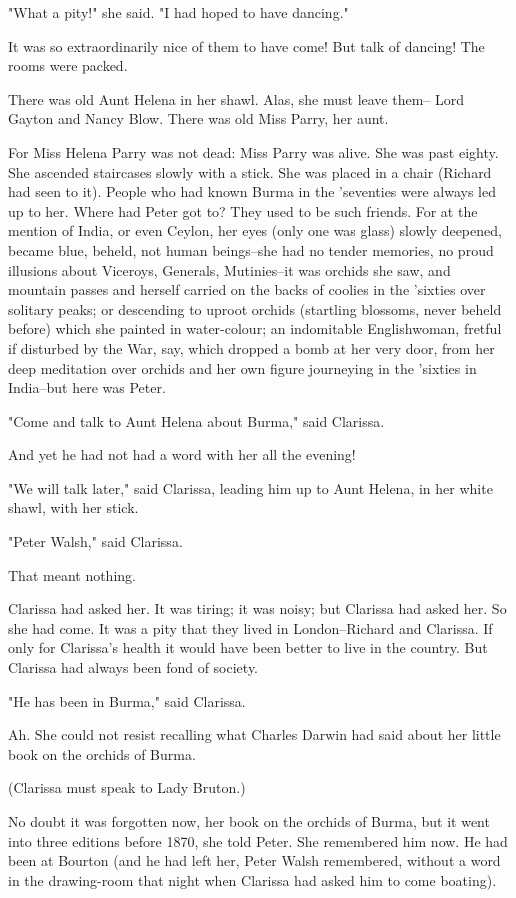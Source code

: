 \documentclass[lang=cn,10pt]{elegantbook}
\begin{document}
"What a pity!" she said.  "I had hoped to have dancing."

It was so extraordinarily nice of them to have come!  But talk of
dancing!  The rooms were packed.

There was old Aunt Helena in her shawl.  Alas, she must leave them--
Lord Gayton and Nancy Blow.  There was old Miss Parry, her aunt.

For Miss Helena Parry was not dead: Miss Parry was alive.  She was
past eighty.  She ascended staircases slowly with a stick.  She was
placed in a chair (Richard had seen to it).  People who had known
Burma in the 'seventies were always led up to her.  Where had Peter
got to?  They used to be such friends.  For at the mention of
India, or even Ceylon, her eyes (only one was glass) slowly
deepened, became blue, beheld, not human beings--she had no tender
memories, no proud illusions about Viceroys, Generals, Mutinies--it
was orchids she saw, and mountain passes and herself carried on the
backs of coolies in the 'sixties over solitary peaks; or descending
to uproot orchids (startling blossoms, never beheld before) which
she painted in water-colour; an indomitable Englishwoman, fretful
if disturbed by the War, say, which dropped a bomb at her very
door, from her deep meditation over orchids and her own figure
journeying in the 'sixties in India--but here was Peter.

"Come and talk to Aunt Helena about Burma," said Clarissa.

And yet he had not had a word with her all the evening!

"We will talk later," said Clarissa, leading him up to Aunt Helena,
in her white shawl, with her stick.

"Peter Walsh," said Clarissa.

That meant nothing.

Clarissa had asked her.  It was tiring; it was noisy; but Clarissa
had asked her.  So she had come.  It was a pity that they lived in
London--Richard and Clarissa.  If only for Clarissa's health it
would have been better to live in the country.  But Clarissa had
always been fond of society.

"He has been in Burma," said Clarissa.

Ah.  She could not resist recalling what Charles Darwin had said
about her little book on the orchids of Burma.

(Clarissa must speak to Lady Bruton.)

No doubt it was forgotten now, her book on the orchids of Burma,
but it went into three editions before 1870, she told Peter.  She
remembered him now.  He had been at Bourton (and he had left her,
Peter Walsh remembered, without a word in the drawing-room that
night when Clarissa had asked him to come boating).
\end{document}
